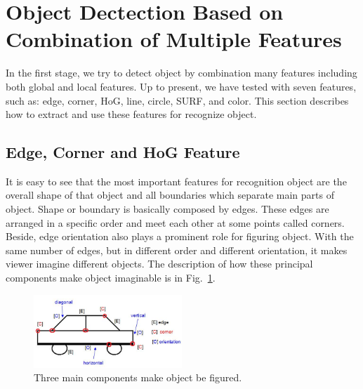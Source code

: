 \section{Object Dectection Based on Combination of Multiple Features}
\label{sec:objectdetection}
In the first stage, we try to detect object by combination many
features including both global and local features. Up to present, we
have tested with seven features, such as: edge, corner, HoG, line,
circle, SURF, and color. This section describes how to extract and use
these features for recognize object.
\subsection{Edge, Corner and HoG Feature}
It is easy to see that the most important features for recognition
object are the overall shape of that object and all boundaries which
separate main parts of object. Shape or boundary is basically
composed by edges. These edges are arranged in a specific order and
meet each other at some points called corners. Beside, edge
orientation also plays a prominent role for figuring object. With the
same number of edges, but in different order and different orientation,
it makes viewer imagine different objects. The description of how
these principal components make object imaginable is in Fig.~\ref{fig:3components}.
\begin{figure}[ht]
  \centering
  \includegraphics[width=2.20in]{images/edge_cornre_HoG.jpg}
  \caption{Three main components make object be figured.}
  \label{fig:3components}
\end{figure}

